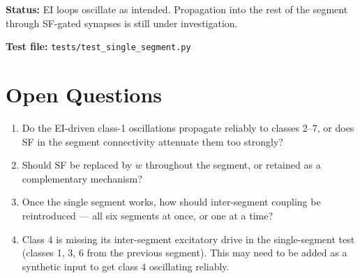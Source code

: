 \documentclass[11pt]{article}
\begin{document}
\textbf{Status:} EI loops oscillate as intended. Propagation into the rest of the segment through SF-gated synapses is still under investigation.

\textbf{Test file:} \texttt{tests/test\_single\_segment.py}

\section{Open Questions}

\begin{enumerate}
  \item Do the EI-driven class-1 oscillations propagate reliably to classes 2--7, or does SF in the segment connectivity attenuate them too strongly?
  \item Should SF be replaced by $w$ throughout the segment, or retained as a complementary mechanism?
  \item Once the single segment works, how should inter-segment coupling be reintroduced --- all six segments at once, or one at a time?
  \item Class 4 is missing its inter-segment excitatory drive in the single-segment test (classes 1, 3, 6 from the previous segment). This may need to be added as a synthetic input to get class 4 oscillating reliably.
\end{enumerate}
\end{document}
